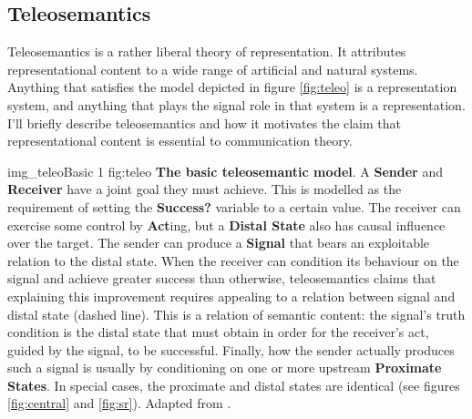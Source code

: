 \documentclass[12pt]{article}
\begin{document}
\subsection{Teleosemantics}
Teleosemantics is a rather liberal theory of representation.
It attributes representational content to a wide range of artificial and natural systems.
Anything that satisfies the model depicted in figure \ref{fig:teleo} is a representation system, and anything that plays the signal role in that system is a representation.
I'll briefly describe teleosemantics and how it motivates the claim that representational content is essential to communication theory.

\begin{myfig}
    {img_teleoBasic} %
    {1} %
    {fig:teleo} %
    {\textbf{The basic teleosemantic model}. 
    A \textbf{Sender} and \textbf{Receiver} have a joint goal they must achieve. 
    This is modelled as the requirement of setting the \textbf{Success?} variable to a certain value. 
    The receiver can exercise some control by \textbf{Act}ing, but a \textbf{Distal State} also has causal influence over the target. 
    The sender can produce a \textbf{Signal} that bears an exploitable relation to the distal state.
    When the receiver can condition its behaviour on the signal and achieve greater success than otherwise, teleosemantics claims that explaining this improvement requires appealing to a relation between signal and distal state (dashed line).
    This is a relation of semantic content: the signal's truth condition is the distal state that must obtain in order for the receiver's act, guided by the signal, to be successful.
    Finally, how the sender actually produces such a signal is usually by conditioning on one or more upstream \textbf{Proximate States}.
    In special cases, the proximate and distal states are identical (see figures \ref{fig:central} and \ref{fig:sr}).
    Adapted from \citet[fig. 6.3, p. 78]{millikan2004varieties}.
    } %
\end{myfig}
\end{document}

